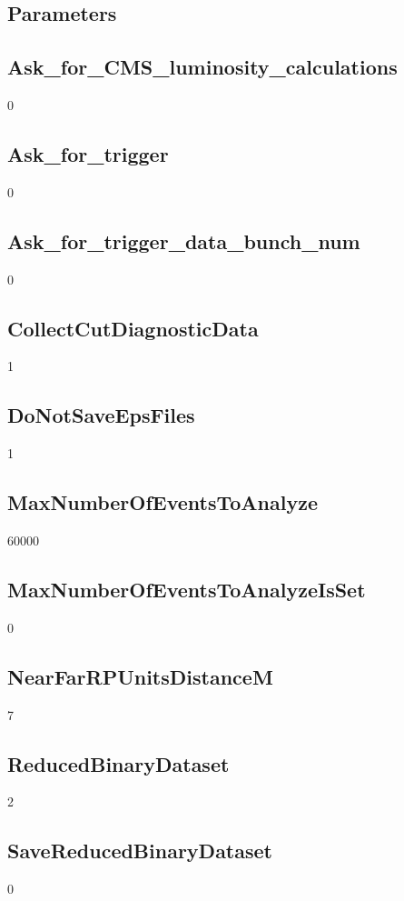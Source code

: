 \documentclass{article}
\begin{document}
\begin{landscape}
\tableofcontents
\newpage
\section{Parameters}
\subsection{Ask\_for\_CMS\_luminosity\_calculations}
0 \newline
\subsection{Ask\_for\_trigger}
0 \newline
\subsection{Ask\_for\_trigger\_data\_bunch\_num}
0 \newline
\subsection{CollectCutDiagnosticData}
1 \newline
\subsection{DoNotSaveEpsFiles}
1 \newline
\subsection{MaxNumberOfEventsToAnalyze}
60000 \newline
\subsection{MaxNumberOfEventsToAnalyzeIsSet}
0 \newline
\subsection{NearFarRPUnitsDistanceM}
7 \newline
\subsection{ReducedBinaryDataset}
2 \newline
\subsection{SaveReducedBinaryDataset}
0 \newline

\end{landscape}
\end{document}
